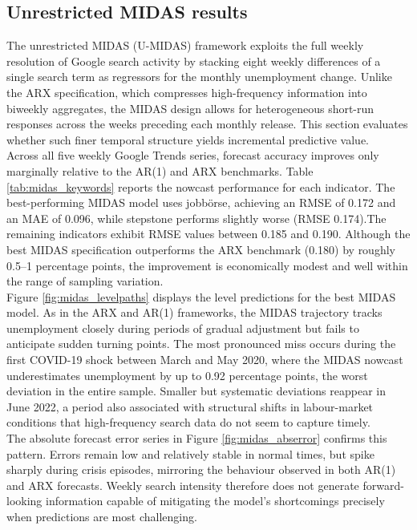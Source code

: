 \documentclass[12pt,a4paper]{article}
\begin{document}
\subsection{Unrestricted MIDAS results}
The unrestricted MIDAS (U-MIDAS) framework exploits the full weekly resolution of Google search activity by stacking eight weekly differences of a single search term as regressors for the monthly unemployment change. Unlike the ARX specification, which compresses high-frequency information into biweekly aggregates, the MIDAS design allows for heterogeneous short-run responses across the weeks preceding each monthly release. This section evaluates whether such finer temporal structure yields incremental predictive value.\\
Across all five weekly Google Trends series, forecast accuracy improves only marginally relative to the AR(1) and ARX benchmarks. Table \ref{tab:midas_keywords} reports the nowcast performance for each indicator. The best-performing MIDAS model uses jobbörse, achieving an RMSE of 0.172 and an MAE of 0.096, while stepstone performs slightly worse (RMSE 0.174).The remaining indicators exhibit RMSE values between 0.185 and 0.190. Although the best MIDAS specification outperforms the ARX benchmark (0.180) by roughly 0.5–1 percentage points, the improvement is economically modest and well within the range of sampling variation.\\
Figure \ref{fig:midas_levelpaths} displays the level predictions for the best MIDAS model. As in the ARX and AR(1) frameworks, the MIDAS trajectory tracks unemployment closely during periods of gradual adjustment but fails to anticipate sudden turning points. The most pronounced miss occurs during the first COVID-19 shock between March and May 2020, where the MIDAS nowcast underestimates unemployment by up to 0.92 percentage points, the worst deviation in the entire sample. Smaller but systematic deviations reappear in June 2022, a period also associated with structural shifts in labour-market conditions that high-frequency search data do not seem to capture timely.\\
The absolute forecast error series in Figure \ref{fig:midas_abserror} confirms this pattern. Errors remain low and relatively stable in normal times, but spike sharply during crisis episodes, mirroring the behaviour observed in both AR(1) and ARX forecasts. Weekly search intensity therefore does not generate forward-looking information capable of mitigating the model’s shortcomings precisely when predictions are most challenging.\\
\end{document}
